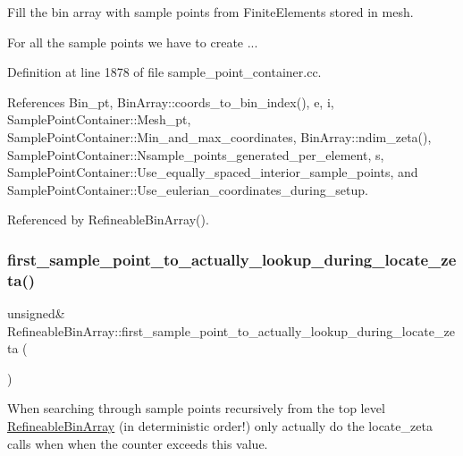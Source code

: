 Fill the bin array with sample points from Finite\+Elements stored in mesh. 

For all the sample points we have to create ... 

Definition at line 1878 of file sample\+\_\+point\+\_\+container.\+cc.



References Bin\+\_\+pt, Bin\+Array\+::coords\+\_\+to\+\_\+bin\+\_\+index(), e, i, Sample\+Point\+Container\+::\+Mesh\+\_\+pt, Sample\+Point\+Container\+::\+Min\+\_\+and\+\_\+max\+\_\+coordinates, Bin\+Array\+::ndim\+\_\+zeta(), Sample\+Point\+Container\+::\+Nsample\+\_\+points\+\_\+generated\+\_\+per\+\_\+element, s, Sample\+Point\+Container\+::\+Use\+\_\+equally\+\_\+spaced\+\_\+interior\+\_\+sample\+\_\+points, and Sample\+Point\+Container\+::\+Use\+\_\+eulerian\+\_\+coordinates\+\_\+during\+\_\+setup.



Referenced by Refineable\+Bin\+Array().

\mbox{\label{classRefineableBinArray_aade552fd473125fd624222672c90a3d5}} 
\subsubsection{\texorpdfstring{first\+\_\+sample\+\_\+point\+\_\+to\+\_\+actually\+\_\+lookup\+\_\+during\+\_\+locate\+\_\+zeta()}{first\_sample\_point\_to\_actually\_lookup\_during\_locate\_zeta()}}
{\footnotesize\ttfamily unsigned\& Refineable\+Bin\+Array\+::first\+\_\+sample\+\_\+point\+\_\+to\+\_\+actually\+\_\+lookup\+\_\+during\+\_\+locate\+\_\+zeta (\begin{DoxyParamCaption}{ }\end{DoxyParamCaption})\hspace{0.3cm}{\ttfamily [inline]}}



When searching through sample points recursively from the top level \hyperlink{classRefineableBinArray}{Refineable\+Bin\+Array} (in deterministic order!) only actually do the locate\+\_\+zeta calls when when the counter exceeds this value. 



